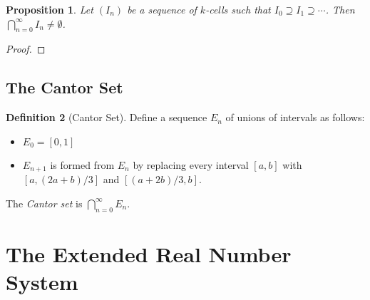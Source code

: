 \documentclass{book}
\let\qed\relax
\newtheorem{prop}{Proposition}[chapter]
\theoremstyle{definition}
\newtheorem{df}[prop]{Definition}
\begin{document}
\begin{prop}
Let $(I_n)$ be a sequence of $k$-cells such that $I_0 \supseteq I_1 \supseteq \cdots$. Then $\bigcap_{n=0}^\infty I_n \neq \emptyset$.
\end{prop}

\begin{proof}
\pf
{}
\qed
\end{proof}

\subsection{The Cantor Set}

\begin{df}[Cantor Set]
Define a sequence $E_n$ of unions of intervals as follows:
\begin{itemize}
\item $E_0 = [0,1]$
\item $E_{n+1}$ is formed from $E_n$ by replacing every interval $[a,b]$ with $[a,(2a+b)/3]$ and $[(a+2b)/3,b]$.
\end{itemize}
The \emph{Cantor set} is $\bigcap_{n=0}^\infty E_n$.
\end{df}

\section{The Extended Real Number System}
\end{document}
